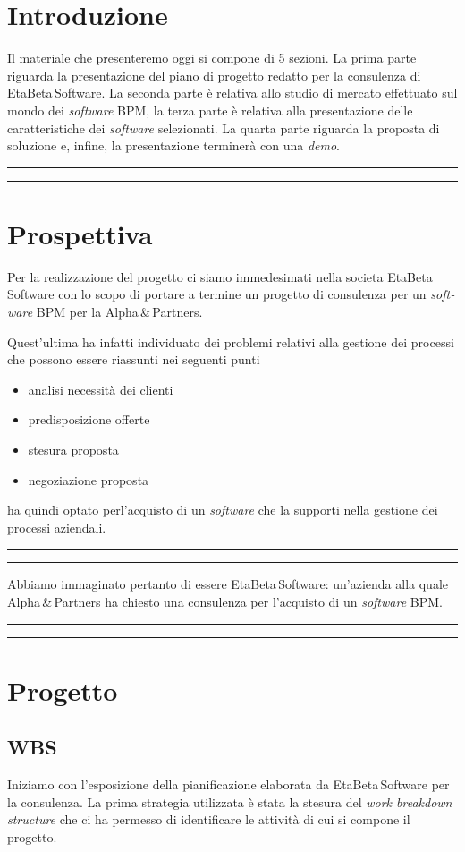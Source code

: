 \documentclass[a4paper,10pt]{article}
\newcommand{\inglese}[1]{\foreignlanguage{english}{\textit{#1}}}
\newcommand{\team}{\textsf{EtaBeta\,Software}\xspace}
\newcommand{\sw}{\inglese{software}\xspace}
\newcommand{\customer}{\textsf{Alpha\,\&\,Partners}\xspace}
\newcommand{\cambioslide}{%
\begin{center}
\Large
\rule[4pt]{0.2\linewidth}{.7pt} \ding{167} \rule[4pt]{0.2\linewidth}{.7pt}
\end{center}
}
\begin{document}
\section{Introduzione}
Il materiale che presenteremo oggi si compone di 5 sezioni. La prima parte riguarda la presentazione del piano di progetto redatto per la consulenza di \team. La seconda parte è relativa allo studio di mercato effettuato sul mondo dei \sw BPM, la terza parte è relativa alla presentazione delle caratteristiche dei \sw selezionati. La quarta parte riguarda la proposta di soluzione e, infine, la presentazione terminerà con una \inglese{demo}.

\cambioslide

\section{Prospettiva}
Per la realizzazione del progetto ci siamo immedesimati nella societa \team con lo scopo di portare a termine un progetto di consulenza per un \sw BPM per la \customer.

Quest'ultima ha infatti individuato dei problemi relativi alla gestione dei processi che possono essere riassunti nei seguenti punti
\begin{itemize}
  \item analisi necessità dei clienti
  \item predisposizione offerte
  \item stesura proposta
  \item negoziazione proposta
\end{itemize}
ha quindi optato perl'acquisto di un \sw che la supporti nella gestione dei processi aziendali.

\cambioslide

Abbiamo immaginato pertanto di essere \team: un'azienda alla quale \customer ha chiesto una consulenza per l'acquisto di un \sw BPM.

\cambioslide

\section{Progetto}

\subsection{WBS}
Iniziamo con l'esposizione della pianificazione elaborata da \team per la consulenza. La prima strategia utilizzata è stata la stesura del \inglese{work breakdown structure} che ci ha permesso di identificare le attività di cui si compone il progetto.
\end{document}
